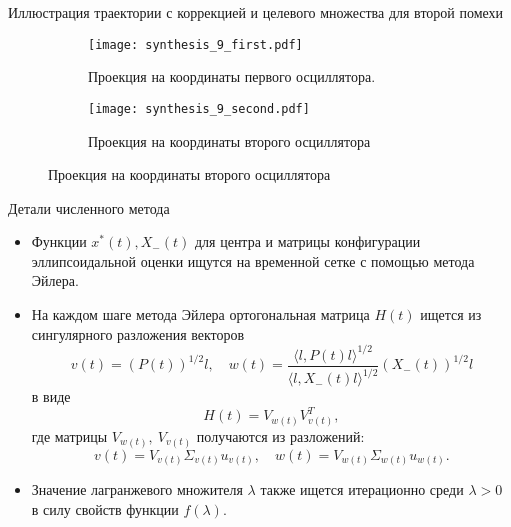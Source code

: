 \documentclass{beamer}
\begin{document}
\begin{frame}{Иллюстрация траектории с коррекцией и целевого множества для второй помехи}
    \begin{figure}[ht]
    \centering
    \begin{subfigure}[b]{0.45\textwidth}
        \centering
        \texttt{[image: synthesis\_9\_first.pdf]}
        \caption{Проекция на координаты первого осциллятора.}
        \label{subfig:synthesis_2_first}
    \end{subfigure}
    \hfill
    \begin{subfigure}[b]{0.45\textwidth}
        \centering
        \texttt{[image: synthesis\_9\_second.pdf]}
        \caption{Проекция на координаты второго осциллятора}
        \label{subfig:synthesis_2_second}
    \end{subfigure}
    \label{fig:synthesis_2}
    \end{figure}
    
\end{frame}

\begin{frame}{Детали численного метода}
\small
\begin{itemize}
    \item Функции \( x^*(t), X_-(t) \) для центра и матрицы конфигурации эллипсоидальной оценки ищутся на временной сетке с помощью метода Эйлера.
    \item На каждом шаге метода Эйлера ортогональная матрица \( H(t) \) ищется из сингулярного разложения векторов
    \begin{equation*}
        v(t) = (P(t))^{1/2} l, \quad w(t) = \frac{\langle l, P(t) l \rangle^{1/2}}{\langle l, X_-(t) l \rangle^{1/2}} (X_-(t))^{1/2} l
    \end{equation*}
    в виде
    \begin{equation*}
        H(t) = V_{w(t)} V_{v(t)}^T,
    \end{equation*}
    где матрицы \( V_{w(t)}, \ V_{v(t)} \) получаются из разложений:
    \begin{equation*}
    v(t) = V_{v(t)} \Sigma_{v(t)} u_{v(t)}, \quad w(t) = V_{w(t)} \Sigma_{w(t)} u_{w(t)}.
    \end{equation*}
    \item Значение лагранжевого множителя \( \lambda \) также ищется итерационно среди \( \lambda > 0 \) в силу свойств функции \( f(\lambda) \).
\end{itemize}
    
\end{frame}
\end{document}
